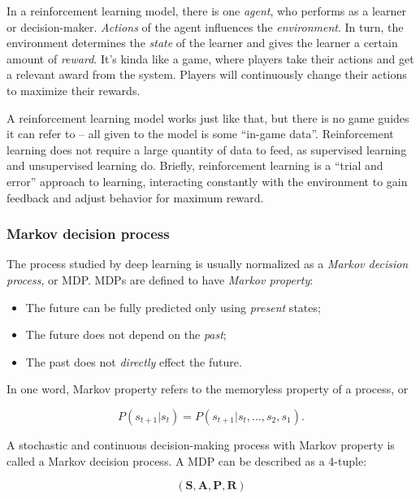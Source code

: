 \documentclass{mcmthesis}
\begin{document}
In a reinforcement learning model, there is one \textit{agent},
who performs as a learner or decision-maker.
\textit{Actions} of the agent influences the \textit{environment}.
In turn, the environment determines the \textit{state} of the learner
and gives the learner a certain amount of \textit{reward}.
It's kinda like a game, where players take their actions and get a relevant award from the system.
Players will continuously change their actions to maximize their rewards.

A reinforcement learning model works just like that,
but there is no game guides it can refer to --
all given to the model is some ``in-game data''.
Reinforcement learning does not require a large quantity of data to feed,
as supervised learning and unsupervised learning do.
Briefly, reinforcement learning is a ``trial and error'' approach to learning,
interacting constantly with the environment to gain feedback and
adjust behavior for maximum reward.

\subsubsection{Markov decision process}

 The process studied by deep learning is usually normalized as a \textit{Markov decision process}, or MDP.
MDPs are defined to have \textit{Markov property}:

\begin{itemize}
  \item The future can be fully predicted only using \textit{present} states;
  \item The future does not depend on the \textit{past};
  \item The past does not \textit{directly} effect the future.
\end{itemize}

In one word, Markov property refers to the memoryless property of a process, or

\begin{equation}
  P(s_{t+1}\vert s_t) = P(s_{t+1}\vert s_t,...,s_2,s_1).
\end{equation}

A stochastic and continuous decision-making process with Markov property
is called a Markov decision process.
A MDP can be described as a 4-tuple:

\begin{equation}
(\pmb{S},\pmb{A},\pmb{P},\pmb{R})
\end{equation}
\end{document}
